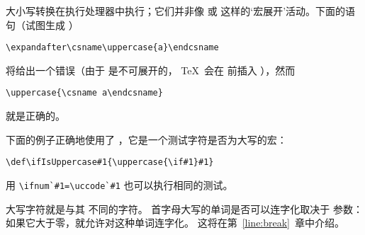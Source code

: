 \documentclass{book}
\begin{document}
大小写转换在执行处理器中执行；它们并非像 或 
这样的`宏展开'活动。下面的语句（试图生成 ）
\begin{verbatim}
\expandafter\csname\uppercase{a}\endcsname
\end{verbatim}
将给出一个错误（由于  是不可展开的，
\TeX\ 会在  前插入 ），然而
\begin{verbatim}
\uppercase{\csname a\endcsname}
\end{verbatim}
就是正确的。

下面的例子正确地使用了 ，它是一个测试字符是否为大写的宏：
\begin{verbatim}
\def\ifIsUppercase#1{\uppercase{\if#1}#1}
\end{verbatim}
用 \verb>\ifnum`#1=\uccode`#1> 也可以执行相同的测试。

大写字符就是与其  不同的字符。
首字母大写的单词是否可以连字化取决于  参数：
如果它大于零，就允许对这种单词连字化。
这将在第~\ref{line:break}~章中介绍。

\end{document}
